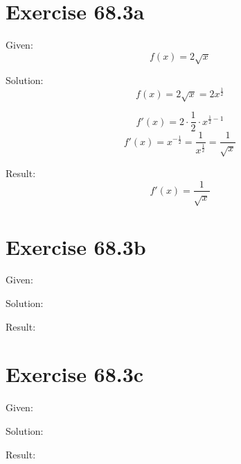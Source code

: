 \documentclass[a4paper, 10pt]{scrartcl}
\begin{document}
\section{Exercise 68.3a}

Given:
\[f(x) = 2\sqrt{x}\]

Solution:
\[f(x) = 2\sqrt{x} = 2x^{\frac{1}{2}}\]

\[f'(x) = 2\cdot\frac{1}{2}\cdot x^{\frac{1}{2} - 1}\]
\[f'(x) = x^{-\frac{1}{2}} = \frac{1}{x^\frac{1}{2}} = \frac{1}{\sqrt{x}}\]

Result:
\[f'(x) = \frac{1}{\sqrt{x}}\]

\section{Exercise 68.3b}

Given:

Solution:

Result:

\section{Exercise 68.3c}

Given:

Solution:

Result:
\end{document}

